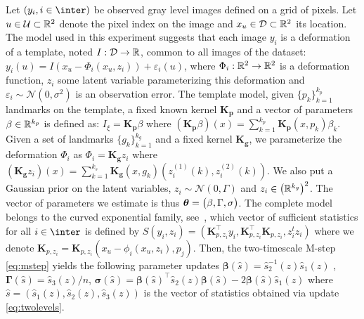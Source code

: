 \documentclass[conference,letterpaper]{IEEEtran}
\begin{document}
Let $(y_i, i \in \inter)$ be observed gray level images defined on a grid of pixels.
Let $u \in \mathcal{U} \subset \mathbb{R}^2$ denote the pixel index on the image and $x_u \in \mathcal{D} \subset \mathbb{R}^2$ its location.
The model used in this experiment suggests that each image $y_i$ is a deformation of a template, noted $I: \mathcal{D} \to \mathbb{R}$, common to all images of the dataset: $y_{i}(u)=I\left(x_{u}-\Phi_{i}\left(x_{u}, z_i\right)\right)+\varepsilon_{i}(u)$, where $\Phi_i: \mathbb{R}^2 \to \mathbb{R}^2$ is a deformation function, $z_i$ some latent variable parameterizing this deformation and $\varepsilon_{i} \sim \mathcal{N}(0,\sigma^2)$ is an observation error.
The template model, given $\{p_k\}_{k=1}^{k_p}$ landmarks on the template, a fixed known kernel $\mathbf{K}_{\mathbf{p}}$ and a vector of parameters $\beta \in \mathbb{R}^{k_p}$ is defined as: $I_{\xi}=\mathbf{K}_{\mathbf{p}} \beta$ where $\left(\mathbf{K}_{\mathbf{p}} \beta \right)(x)=\sum_{k=1}^{k_{p}} \mathbf{K}_{\mathbf{p}}\left(x, p_{k}\right) \beta_k$.
Given a set of landmarks $\{g_k\}_{k=1}^{k_g}$ and a fixed kernel $\mathbf{K}_{\mathbf{g}}$, we parameterize the deformation $\Phi_{i}$ as $\Phi_{i}=\mathbf{K}_{\mathbf{g}} z_{i} $  where  $\left(\mathbf{K}_{\mathbf{g}} z_{i}\right)(x)=\sum_{k=1}^{k_{s}} \mathbf{K}_{\mathbf{g}}\left(x, g_{k}\right)\left(z_{i}^{(1)}(k), z_{i}^{(2)}(k)\right)$. 
We also put a Gaussian prior on the latent variables, $z_i \sim \mathcal{N}(0,\Gamma)$ and $z_i \in \left( \mathbb{R}^{k_g}\right)^2$.
The vector of parameters we estimate is thus ${\bm{\theta}} = \big( \beta, \Gamma, \sigma  \big)$.
The complete model belongs to the curved exponential family, see~\cite{allassonniere2007towards}, which vector of sufficient statistics for all $i \in \inter$ is defined by $S(y_i,z_i) = ( \mathbf{K}_{p,z_{i}}^\top y_{i}, \mathbf{K}_{p,z_{i}}^\top \mathbf{K}_{p,z_{i}},  z_{i}^{t} z_{i} )$ where we denote $\mathbf{K}_{p,z_{i}} = \mathbf{K}_{p,z_{i}}(x_u - \phi_i(x_u,z_i), p_j)$.
Then, the two-timescale M-step \eqref{eq:mstep} yields the following parameter updates $\bm{\beta}(\hat{s}) =   \hat{s}_2^{-1}(z) \hat{s}_1(z)$ ,$ \bm{\Gamma}(\hat{s}) =  \hat{s}_3(z)/n$, $ \bm{\sigma}(\hat{s}) =\bm{\beta}(\hat{s})^\top  \hat{s}_2(z) \bm{\beta}(\hat{s}) - 2\bm{\beta}(\hat{s}) \hat{s}_1(z)$ where $\hat{s} = (\hat{s}_1(z),\hat{s}_2(z),\hat{s}_3(z))$ is the vector of statistics obtained via update \eqref{eq:twolevels}.
\end{document}
